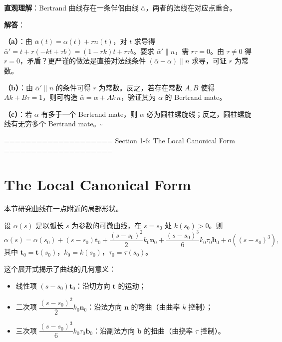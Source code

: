 \begin{solution}
\textbf{直观理解}：Bertrand 曲线存在一条伴侣曲线 $\bar{\alpha}$，两者的法线在对应点重合。

\textbf{解答}：

\textbf{（a）}：由 $\bar{\alpha}(t) = \alpha(t) + r n(t)$，对 $t$ 求导得 $\bar{\alpha}' = t + r(-kt + \tau b) = (1-rk)t + r\tau b$。要求 $\bar{\alpha}' \parallel n$，需 $r\tau = 0$。由 $\tau\neq 0$ 得 $r = 0$，矛盾？更严谨的做法是直接对法线条件 $(\bar{\alpha}-\alpha)\parallel n$ 求导，可证 $r$ 为常数。

\textbf{（b）}：由 $\bar{\alpha}' \parallel n$ 的条件可得 $r$ 为常数。反之，若存在常数 $A, B$ 使得 $Ak + B\tau = 1$，则可构造 $\bar{\alpha} = \alpha + Ak\, n$，验证其为 $\alpha$ 的 Bertrand mate。

\textbf{（c）}：若 $\alpha$ 有多于一个 Bertrand mate，则 $\alpha$ 必为圆柱螺旋线；反之，圆柱螺旋线有无穷多个 Bertrand mate。$\square$
\end{solution}
==================== Section 1-6: The Local Canonical Form ====================
\section{The Local Canonical Form}\label{sec:local-canonical-form-ch1}

本节研究曲线在一点附近的局部形状。

\begin{Theorem}[曲线在一点的局部标准形式]\label{th:local-canonical-form-ch1}
设 $\alpha(s)$ 是以弧长 $s$ 为参数的可微曲线，在 $s = s_0$ 处 $k(s_0) > 0$。则
\[
\alpha(s) = \alpha(s_0) + (s - s_0)\mathbf{t}_0 + \frac{(s - s_0)^2}{2}k_0\mathbf{n}_0 + \frac{(s - s_0)^3}{6}k_0\tau_0\mathbf{b}_0 + o((s - s_0)^3),
\]
其中 $\mathbf{t}_0 = \mathbf{t}(s_0)$，$k_0 = k(s_0)$，$\tau_0 = \tau(s_0)$。
\end{Theorem}

\begin{Remark}
这个展开式揭示了曲线的几何意义：
\begin{itemize}
\item 线性项 $(s - s_0)\mathbf{t}_0$：沿切方向 $\mathbf{t}$ 的运动；
\item 二次项 $\dfrac{(s - s_0)^2}{2}k_0\mathbf{n}_0$：沿法方向 $\mathbf{n}$ 的弯曲（由曲率 $k$ 控制）；
\item 三次项 $\dfrac{(s - s_0)^3}{6}k_0\tau_0\mathbf{b}_0$：沿副法方向 $\mathbf{b}$ 的扭曲（由挠率 $\tau$ 控制）。
\end{itemize}
\end{Remark}

